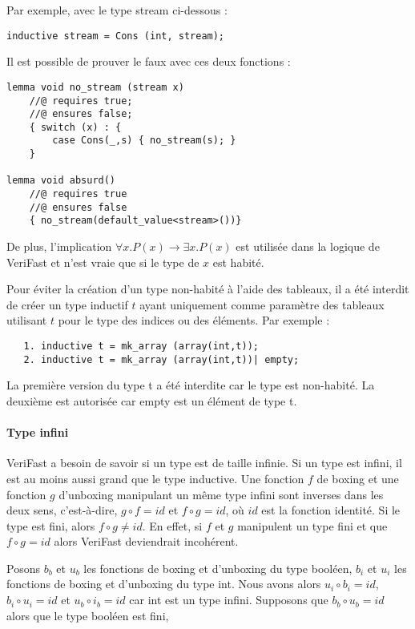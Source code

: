 \documentclass[11pt,openany]{article}
\newcommand{\verifast}{VeriFast}
\begin{document}
		Par exemple, avec le type stream ci-dessous :
\begin{lstlisting}
inductive stream = Cons (int, stream);
\end{lstlisting}
Il est possible de prouver le faux avec ces deux fonctions :
\begin{lstlisting}
lemma void no_stream (stream x)
	//@ requires true;
	//@ ensures false;
	{ switch (x) : {
		case Cons(_,s) { no_stream(s); }
	}

lemma void absurd()
	//@ requires true
	//@ ensures false
	{ no_stream(default_value<stream>())}

		\end{lstlisting}

De plus, l'implication
				$\forall x. P(x) \rightarrow \exists x. P(x)$ est utilis\'ee dans la logique de \verifast{} et n'est vraie que si le type de $x$ est habit\'e.
				
				Pour \'eviter la cr\'eation d'un type non-habit\'e \`a l'aide des tableaux, il a \'et\'e interdit de cr\'eer un type inductif $t$ ayant uniquement comme param\`etre des tableaux utilisant $t$ pour le type des indices ou des \'el\'ements. Par exemple :
				\begin{lstlisting}			
   1. inductive t = mk_array (array(int,t));
   2. inductive t = mk_array (array(int,t))| empty;
				\end{lstlisting}
	La premi\`ere version du type t a \'et\'e interdite car le type est non-habit\'e. La deuxi\`eme est autoris\'ee car empty est un \'el\'ement de type t.
			\paragraph{Type infini}
				\verifast{} a besoin de savoir si un type est de taille infinie. Si un type est infini, il est au moins aussi grand que le type inductive. Une fonction $f$ de boxing et une fonction $g$ d'unboxing manipulant un m\^eme type infini sont inverses dans les deux sens, c'est-\`a-dire, $g\circ f = id$ et $f\circ g = id$, o\`u $id$ est la fonction identit\'e. Si le type est fini, alors $f\circ g\neq id$. En effet, si $f$ et $g$ manipulent un type fini et que $f\circ g = id$ alors \verifast{} deviendrait incoh\'erent.
				
		Posons $b_b$ et $u_b$ les fonctions de boxing et d'unboxing du type bool\'een, $b_i$ et $u_i$ les fonctions de boxing et d'unboxing du type int. Nous avons alors $u_i \circ b_i = id$, $b_i\circ u_i=id$ et $u_b\circ i_b=id$ car int est un type infini. Supposons que $b_b\circ u_b=id$ alors que le type bool\'een est fini,
		
\end{document}
